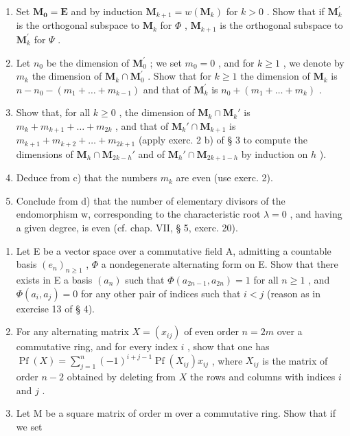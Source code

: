 \begin{enumerate}
\def\labelenumi{\alph{enumi})}
\item
  Set \(\mathbf{M}_{\mathbf{0}} = \mathbf{E}\) and by induction \(\mathbf{M}_{k+1} = w(\mathbf{M}_{k})\) for \(k > 0\) . Show that if \(\mathbf{M}_{k}^{\prime}\) is the orthogonal subspace to \(\mathbf{M}_{k}\) for \(\Phi\) , \(\mathbf{M}_{k+1}\) is the orthogonal subspace to \(\mathbf{M}_{k}^{\prime}\) for \(\Psi\) .
\item
  Let \(n_{0}\) be the dimension of \(\mathbf{M}_{0}^{\prime}\) ; we set \(m_{0}=0\) , and for \(k\geqslant1\) , we denote by \(m_{k}\) the dimension of \(\mathbf{M}_{k}\cap\mathbf{M}_{0}^{\prime}\) . Show that for \(k\geqslant1\) the dimension of \(\mathbf{M}_{k}\) is \(n-n_{0}-(m_{1}+\ldots+m_{k-1})\) and that of \(\mathbf{M}_{k}^{\prime}\) is \(n_{0}+(m_{1}+\ldots+m_{k})\) .
\item
  Show that, for all \(k \geqslant 0\) , the dimension of \(\mathbf{M}_k \cap \mathbf{M}_k'\) is \(m_k + m_{k+1} + \ldots + m_{2k}\) , and that of \(\mathbf{M}_k' \cap \mathbf{M}_{k+1}\) is \(m_{k+1} + m_{k+2} + \ldots + m_{2k+1}\) (apply exerc. 2 b) of § 3 to compute the dimensions of \(\mathbf{M}_h \cap \mathbf{M}_{2k-h}'\) and of \(\mathbf{M}_h' \cap \mathbf{M}_{2k+1-h}\) by induction on \(h\) ).
\item
  Deduce from c) that the numbers \(m_{k}\) are even (use exerc. 2).
\item
  Conclude from d) that the number of elementary divisors of the endomorphism w, corresponding to the characteristic root \(\lambda = 0\) , and having a given degree, is even (cf. chap. VII, § 5, exerc. 20).
\end{enumerate}

\begin{enumerate}
\def\labelenumi{\arabic{enumi})}
\setcounter{enumi}{3}
\item
  Let E be a vector space over a commutative field A, admitting a countable basis \((e_n)_{n\geqslant 1}\) , \(\Phi\) a nondegenerate alternating form on E. Show that there exists in E a basis \((a_n)\) such that \(\Phi(a_{2n-1}, a_{2n}) = 1\) for all \(n\geqslant 1\) , and \(\Phi(a_i, a_j) = 0\) for any other pair of indices such that \(i < j\) (reason as in exercise 13 of § 4).
\item
  For any alternating matrix \(X = (x_{ij})\) of even order \(n = 2m\) over a commutative ring, and for every index \(i\) , show that one has \(\operatorname{Pf}(X) = \sum_{j=1}^{n} (-1)^{i+j-1} \operatorname{Pf}(X_{ij}) x_{ij}\) , where \(X_{ij}\) is the matrix of order \(n - 2\) obtained by deleting from \(X\) the rows and columns with indices \(i\) and \(j\) .
\item
  Let M be a square matrix of order m over a commutative ring. Show that if we set
\end{enumerate}

